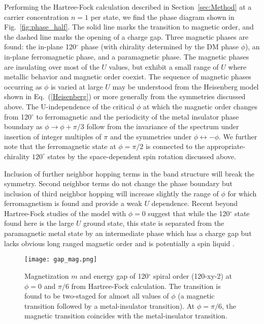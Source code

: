 \documentclass[%
reprint,
superscriptaddress,
twocolumn,
 amsmath,amssymb,
 aps,
 prb,
]{revtex4-2}
\begin{document}
Performing the Hartree-Fock calculation described in Section~\ref{sec:Method} at a carrier concentration $n=1$ per state, we find the phase diagram shown in Fig.~\ref{fig:phase_half}. The solid line marks the transition to magnetic order, and the dashed line marks the opening of a charge gap.  Three magnetic phases are found: the in-plane 120$^\circ$ phase (with chirality determined by the DM phase $\phi$), an in-plane ferromagnetic phase, and a paramagnetic phase. The magnetic phases are insulating over most of the $U$ values, but exhibit a small range of $U$ where metallic behavior and magnetic order coexist.  The sequence of magnetic phases occurring as $\phi$ is varied at large $U$ may be understood from the Heisenberg model shown in Eq.~(\ref{Heisenberg}) or more generally from the symmetries discussed above. The U-independence of the critical $\phi$ at which the magnetic order changes from  120$^\circ$ to ferromagnetic and the periodicity of the metal insulator phase boundary as $\phi\rightarrow \phi+\pi/3$ follow from the invariance of the spectrum under insertion of integer multiples of $\pi$ and the symmetries under $\phi \leftrightarrow -\phi$. We further note that the ferromagnetic state at $\phi=\pi/2$ is connected to the appropriate-chirality $120^\circ$ states by the space-dependent spin rotation discussed above. 

 Inclusion of further neighbor hopping terms in the band structure will break the symmetry. Second neighbor terms do not change the phase boundary but inclusion of third neighbor hopping will increase slightly the range of $\phi$ for which ferromagnetism is found and provide a weak $U$ dependence. Recent beyond Hartree-Fock studies of the model with $\phi=0$ suggest that while the 120$^\circ$ state found here is the large $U$ ground state, this state is separated from the paramagnetic metal state by an intermediate phase which has a charge  gap but lacks obvious long ranged magnetic order and is potentially a spin liquid \cite{wietek2021mott,PhysRevB.96.205130,PhysRevX.10.021042,chen2021quantum}.
 
 \begin{figure}[b]
  \texttt{[image: gap\_mag.png]}
  \caption{Magnetization $m$ and energy gap of 120$^\circ$ spiral order (120-xy-2) at $\phi=0$ and $\pi/6$ from Hartree-Fock calculation. The transition is found to be two-staged for almost all values of $\phi$ (a magnetic transition followed by a metal-insulator transition). At $\phi=\pi/6$, the magnetic transition coincides with the metal-insulator transition.}
  \label{fig:magandgap_half}
\end{figure}
\end{document}
